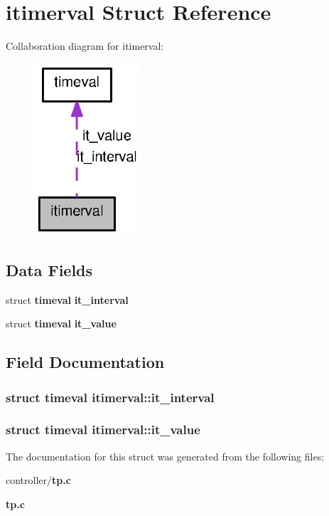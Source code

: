\section{itimerval Struct Reference}
\label{structitimerval}


Collaboration diagram for itimerval:
\nopagebreak
\begin{figure}[H]
\begin{center}
\leavevmode
\includegraphics[width=112pt]{structitimerval__coll__graph}
\end{center}
\end{figure}
\subsection*{Data Fields}
\begin{DoxyCompactItemize}
\item 
struct {\bf timeval} {\bf it\_\-interval}
\item 
struct {\bf timeval} {\bf it\_\-value}
\end{DoxyCompactItemize}


\subsection{Field Documentation}
\subsubsection[{it\_\-interval}]{\setlength{\rightskip}{0pt plus 5cm}struct {\bf timeval} {\bf itimerval::it\_\-interval}}\label{structitimerval_ae37e5edff9a3efa2841f5e614e2c2efb}
\subsubsection[{it\_\-value}]{\setlength{\rightskip}{0pt plus 5cm}struct {\bf timeval} {\bf itimerval::it\_\-value}}\label{structitimerval_a2dc8aae1b0b2e57a7ec8f7d33834495d}


The documentation for this struct was generated from the following files:\begin{DoxyCompactItemize}
\item 
controller/{\bf tp.c}\item 
{\bf tp.c}\end{DoxyCompactItemize}
